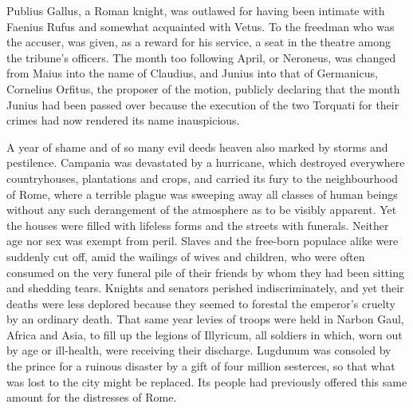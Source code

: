 
Publius Gallus, a Roman knight, was outlawed for having been intimate with Faenius Rufus and somewhat acquainted with Vetus. To the freedman who was the accuser, was given, as a reward for his service, a seat in the theatre among the tribune's officers. The month too following April, or Neroneus, was changed from Maius into the name of Claudius, and Junius into that of Germanicus, Cornelius Orfitus, the proposer of the motion, publicly declaring that the month Junius had been passed over because the execution of the two Torquati for their crimes had now rendered its name inauspicious.


A year of shame and of so many evil deeds heaven also marked by storms and pestilence. Campania was devastated by a hurricane, which destroyed everywhere countryhouses, plantations and crops, and carried its fury to the neighbourhood of Rome, where a terrible plague was sweeping away all classes of human beings without any such derangement of the atmosphere as to be visibly apparent. Yet the houses were filled with lifeless forms and the streets with funerals. Neither age nor sex was exempt from peril. Slaves and the free-born populace alike were suddenly cut off, amid the wailings of wives and children, who were often consumed on the very funeral pile of their friends by whom they had been sitting and shedding tears. Knights and senators perished indiscriminately, and yet their deaths were less deplored because they seemed to forestal the emperor's cruelty by an ordinary death. That same year levies of troops were held in Narbon Gaul, Africa and Asia, to fill up the legions of Illyricum, all soldiers in which, worn out by age or ill-health, were receiving their discharge. Lugdunum was consoled by the prince for a ruinous disaster by a gift of four million sesterces, so that what was lost to the city might be replaced. Its people had previously offered this same amount for the distresses of Rome.


